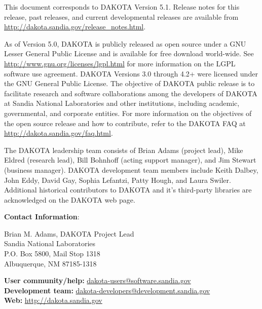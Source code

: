 This document corresponds to DAKOTA Version 5.1.  Release notes for
this release, past releases, and current developmental releases are
available from
\url{http://dakota.sandia.gov/release_notes.html}.

As of Version 5.0, DAKOTA is publicly released as open source under a
GNU Lesser General Public License and is available for free download
world-wide.  See \url{http://www.gnu.org/licenses/lgpl.html} for more
information on the LGPL software use agreement.  DAKOTA Versions 3.0
through 4.2+ were licensed under the GNU General Public License.  The
objective of DAKOTA public release is to facilitate research and
software collaborations among the developers of DAKOTA at Sandia
National Laboratories and other institutions, including academic,
governmental, and corporate entities. For more information on the
objectives of the open source release and how to contribute, refer to
the DAKOTA FAQ at \url{http://dakota.sandia.gov/faq.html}.

The DAKOTA leadership team consists of Brian Adams (project lead),
Mike Eldred (research lead), Bill Bohnhoff (acting support manager),
and Jim Stewart (business manager).  DAKOTA development team members
include Keith Dalbey, John Eddy, David Gay, Sophia Lefantzi, Patty
Hough, and Laura Swiler.  Additional historical contributors to DAKOTA
and it's third-party libraries are acknowledged on the DAKOTA web
page.

\textbf{Contact Information}:

{\small Brian M. Adams, DAKOTA Project Lead}\\
{\small Sandia National Laboratories}\\
{\small P.O. Box 5800, Mail Stop 1318}\\
{\small Albuquerque, NM 87185-1318}

{\small {\bf User community/help:} \href{mailto:dakota-users@software.sandia.gov}{dakota-users@software.sandia.gov}}\\
{\small {\bf Development team:} \href{mailto:dakota-developers@development.sandia.gov}{dakota-developers@development.sandia.gov}}\\
{\small {\bf Web:} \url{http://dakota.sandia.gov}}

